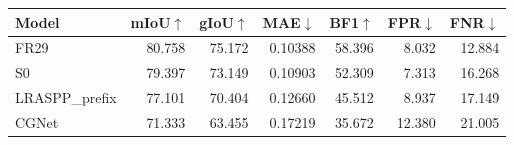 \par\medskip\noindent\begin{minipage}{\linewidth}
\centering\small\setlength{\tabcolsep}{3pt}
\label{tab:gsd}
\begin{tabular}{lrrrrrr}
\toprule
Model & mIoU$\uparrow$ & gIoU$\uparrow$ & MAE$\downarrow$ & BF1$\uparrow$ & FPR$\downarrow$ & FNR$\downarrow$\\\midrule

FR29 & 80.758 & 75.172 & 0.10388 & 58.396 & 8.032 & 12.884\\
S0 & 79.397 & 73.149 & 0.10903 & 52.309 & 7.313 & 16.268\\
LRASPP\_prefix & 77.101 & 70.404 & 0.12660 & 45.512 & 8.937 & 17.149\\
CGNet & 71.333 & 63.455 & 0.17219 & 35.672 & 12.380 & 21.005\\
\bottomrule
\end{tabular}
\end{minipage}\par\medskip
